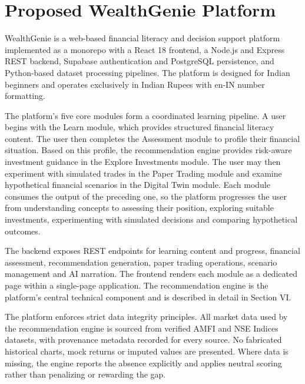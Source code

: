 \section{Proposed WealthGenie Platform}

WealthGenie is a web-based financial literacy and decision support platform implemented as a monorepo with a React 18 frontend, a Node.js and Express REST backend, Supabase authentication and PostgreSQL persistence, and Python-based dataset processing pipelines. The platform is designed for Indian beginners and operates exclusively in Indian Rupees with en-IN number formatting.

The platform's five core modules form a coordinated learning pipeline. A user begins with the Learn module, which provides structured financial literacy content. The user then completes the Assessment module to profile their financial situation. Based on this profile, the recommendation engine provides risk-aware investment guidance in the Explore Investments module. The user may then experiment with simulated trades in the Paper Trading module and examine hypothetical financial scenarios in the Digital Twin module. Each module consumes the output of the preceding one, so the platform progresses the user from understanding concepts to assessing their position, exploring suitable investments, experimenting with simulated decisions and comparing hypothetical outcomes.

The backend exposes REST endpoints for learning content and progress, financial assessment, recommendation generation, paper trading operations, scenario management and AI narration. The frontend renders each module as a dedicated page within a single-page application. The recommendation engine is the platform's central technical component and is described in detail in Section VI.

The platform enforces strict data integrity principles. All market data used by the recommendation engine is sourced from verified AMFI and NSE Indices datasets, with provenance metadata recorded for every source. No fabricated historical charts, mock returns or imputed values are presented. Where data is missing, the engine reports the absence explicitly and applies neutral scoring rather than penalizing or rewarding the gap.